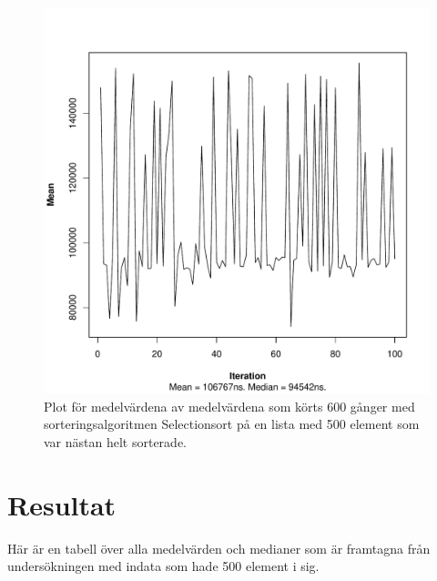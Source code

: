 \documentclass[a4paper]{article}
\begin{document}
\begin{figure}[H]
	\begin{center}
		\includegraphics[scale=0.4]{output/500/AlmostSorted/selectionSort_almost_sorted_500_600_100.pdf}
		\caption{Plot för medelvärdena av medelvärdena som körts 600 gånger med sorteringsalgoritmen Selectionsort på en lista med 500 element som var nästan helt sorterade.}
	\end{center}
\end{figure}

\section{Resultat}
Här är en tabell över alla medelvärden och medianer som är framtagna från undersökningen med indata som hade 500 element i sig. 
\end{document}
